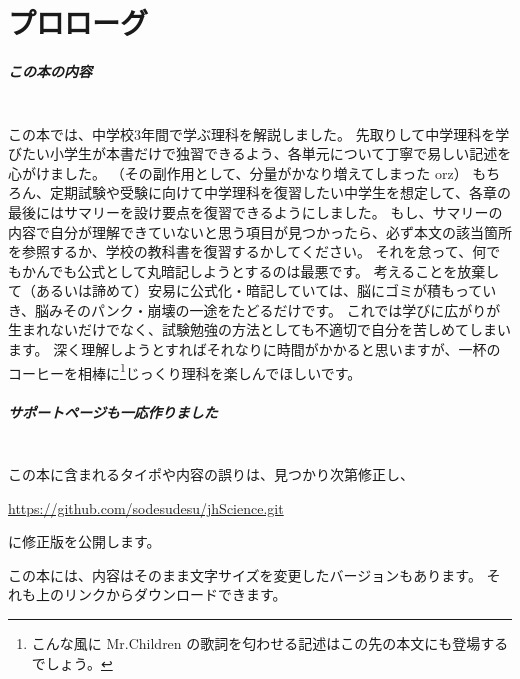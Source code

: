 \chapter{プロローグ}

\paragraph{この本の内容}
\mbox{}\\
\indent
この本では、中学校3年間で学ぶ理科を解説しました。
先取りして中学理科を学びたい小学生が本書だけで独習できるよう、各単元について丁寧で易しい記述を心がけました。
（その副作用として、分量がかなり増えてしまった orz）
もちろん、定期試験や受験に向けて中学理科を復習したい中学生を想定して、各章の最後にはサマリーを設け要点を復習できるようにしました。
もし、サマリーの内容で自分が理解できていないと思う項目が見つかったら、必ず本文の該当箇所を参照するか、学校の教科書を復習するかしてください。
それを怠って、何でもかんでも公式として丸暗記しようとするのは最悪です。
考えることを放棄して（あるいは諦めて）安易に公式化・暗記していては、脳にゴミが積もっていき、脳みそのパンク・崩壊の一途をたどるだけです。
これでは学びに広がりが生まれないだけでなく、試験勉強の方法としても不適切で自分を苦しめてしまいます。
深く理解しようとすればそれなりに時間がかかると思いますが、一杯のコーヒーを相棒に\footnote{%
こんな風に Mr.Children の歌詞を匂わせる記述はこの先の本文にも登場するでしょう。
}じっくり理科を楽しんでほしいです。

\paragraph{サポートページも一応作りました}
\mbox{}\\
\indent
この本に含まれるタイポや内容の誤りは、見つかり次第修正し、
\begin{center}
  \url{https://github.com/sodesudesu/jhScience.git}
\end{center}
に修正版を公開します。

この本には、内容はそのまま文字サイズを変更したバージョンもあります。
それも上のリンクからダウンロードできます。
